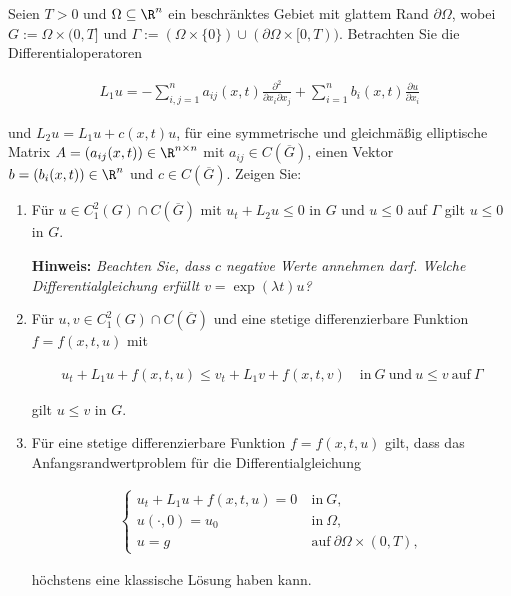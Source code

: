 
\begin{exercise}

\phantom{}

Seien $T > 0$ und $\Omega \subseteq \R^n$ ein beschränktes Gebiet mit glattem Rand $\partial \Omega$, wobei $G := \Omega \times (0, T]$ und $\Gamma := (\Omega \times \{0\}) \cup (\partial \Omega \times [0, T))$.
Betrachten Sie die Differentialoperatoren

\begin{align*}
  L_1 u
  =
  -\sum_{i, j=1}^n
  a_{ij}(x, t)
  \frac{\partial^2}{\partial x_i \partial x_j}
  +
  \sum_{i=1}^n
  b_i(x, t)
  \frac{\partial u}{\partial x_i}
\end{align*}

und $L_2 u = L_1 u + c(x, t) u$, für eine symmetrische und gleichmäßig elliptische Matrix $A = (a_{ij}(x, t)) \in \R^{n \times n}$ mit $a_{ij} \in C(\overline{G})$, einen Vektor $b = (b_i(x, t)) \in \R^n$ und $c \in C(\overline{G})$.
Zeigen Sie:

\begin{enumerate}[label = (\roman*)]

  \item Für $u \in C_1^2(G) \cap C(\overline{G})$ mit $u_t + L_2u \leq 0$ in $G$ und $u \leq 0$ auf $\Gamma$ gilt $u \leq 0$ in $G$.

  \textbf{Hinweis:}
  \textit
  {
    Beachten Sie, dass $c$ negative Werte annehmen darf.
    Welche Differentialgleichung erfüllt $v = \exp(\lambda t) u$?
  }
  
  \item Für $u, v \in C_1^2(G) \cap C(\overline{G})$ und eine stetige differenzierbare Funktion $f = f(x, t, u)$ mit

  \begin{align*}
    u_t + L_1 u + f(x, t, u)
    \leq
    v_t + L_1 v + f(x, t, v)
    \quad
    \text{in}~ G ~\text{und}~ u \leq v ~\text{auf}~ \Gamma
  \end{align*}

  gilt $u \leq v$ in $G$.
  
  \item Für eine stetige differenzierbare Funktion $f = f(x, t, u)$ gilt, dass das Anfangsrandwertproblem für die Differentialgleichung 

  \begin{align*}
	  \begin{cases}
	  	u_t + L_1 u + f(x, t, u) = 0 & ~\text{in}~ G, \\
	  	u(\cdot, 0) = u_0            & ~\text{in}~ \Omega, \\
	  	u = g                        & ~\text{auf}~ \partial \Omega \times (0, T),
	  \end{cases}
  \end{align*}

  höchstens eine klassische Lösung haben kann. 

\end{enumerate}

\end{exercise}

